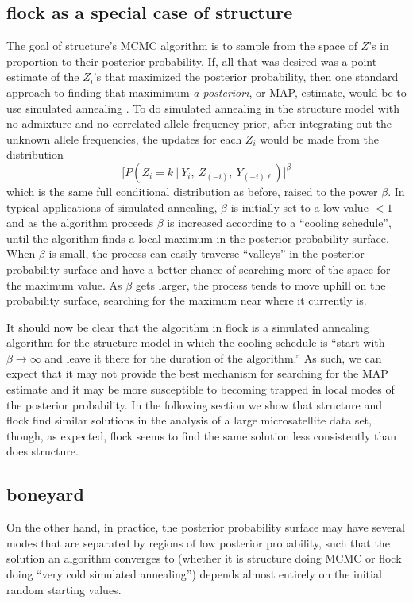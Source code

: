 \subsection*{{\sc flock} as a special case of {\sc structure}}
The goal of {\sc structure}'s MCMC algorithm is to sample from the space of 
$Z$'s in proportion to their posterior probability.  If, all that was desired
was a point estimate of the $Z_i$'s that maximized the posterior probability,
then one standard approach to finding that maximimum {\em a posteriori}, or MAP, 
estimate, would be to use simulated annealing \citep{Kirkpatricketal1983}.
To do simulated annealing in the {\sc structure} model with no admixture and
no correlated allele frequency prior, after integrating out the unknown
allele frequencies, the updates for each $Z_i$ would be made from the 
distribution
\[
\biggl[P(Z_i=k~|~Y_i, ~Z_{(-i)},~Y_{(-i)\ell})\biggr]^\beta
\]
which is the same full conditional distribution as before, raised
to the power $\beta$.  In typical applications of simulated annealing,
$\beta$ is initially set to a low value $<1$ and as the algorithm proceeds
$\beta$ is increased according to a ``cooling schedule''\citep{Hajek1988}, until
the algorithm finds a local maximum in the posterior probability surface.  
When $\beta$ is small, the process can easily traverse ``valleys''
in the posterior probability surface and have a better chance of searching
more of the space for the maximum value.  As $\beta$ gets larger, the process
tends to move uphill on the probability surface, searching for the
maximum near where it currently is.    

It should now be clear that the algorithm in {\sc flock} is a simulated annealing 
algorithm for the {\sc structure} model in which the cooling schedule is
``start with $\beta\rightarrow\infty$ and leave it there for the duration of 
the algorithm.''  As such, we can expect that it may not provide the best 
mechanism for searching for the MAP estimate and it may be more susceptible 
to becoming trapped in local modes of the posterior probability. 
In the following section we show that {\sc structure} and {\sc flock} find similar
solutions in the analysis of a large microsatellite data set, though, as expected,
{\sc flock} seems to find the same solution less consistently than does {\sc structure}.

\subsection*{boneyard}
 On the other hand, in practice, the 
posterior probability surface may have several modes that are separated by regions
of low posterior probability, such that the solution
an algorithm converges to (whether it is {\sc structure}  doing MCMC or {\sc flock} doing 
``very cold simulated annealing'') depends almost entirely on the initial random
starting values.


